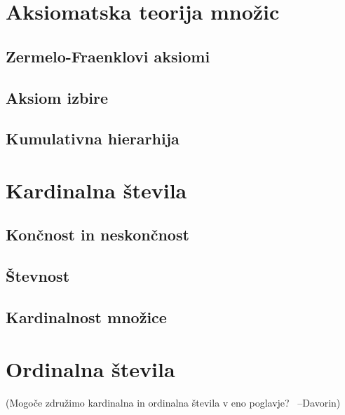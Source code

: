 \documentclass[11pt,a4paper,twoside]{book}
\newcommand{\davorin}[1]{{\small\textcolor{davorincolor}{(#1 \ \mbox{--Davorin})}}}
\begin{document}
	\chapter{Aksiomatska teorija množic}
		\section{Zermelo-Fraenklovi aksiomi}
		\section{Aksiom izbire}
		\section{Kumulativna hierarhija}
	
	\chapter{Kardinalna števila}
		\section{Končnost in neskončnost}
		\section{Števnost}
		\section{Kardinalnost množice}
	
	\chapter{Ordinalna števila}
		\davorin{Mogoče združimo kardinalna in ordinalna števila v eno poglavje?}
	
	
\end{document}
